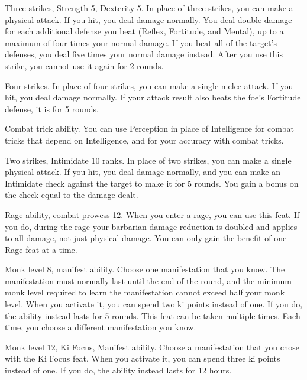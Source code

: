 \featpres Three strikes, Strength 5, Dexterity 5.
\featben In place of three strikes, you can make a physical attack.
If you hit, you deal damage normally.
You deal double damage for each additional defense you beat (Reflex, Fortitude, and Mental), up to a maximum of four times your normal damage.
If you beat all of the target's defenses, you deal five times your normal damage instead.
After you use this strike, you cannot use it again for 2 rounds.

\featpre Four strikes.
\featben In place of four strikes, you can make a single melee attack.
If you hit, you deal damage normally.
If your attack result also beats the foe's Fortitude defense, it is \immobilized for 5 rounds.

\featpre Combat trick ability.
\featben You can use Perception in place of Intelligence for combat tricks that depend on Intelligence, and for your accuracy with combat tricks.

\featpres Two strikes, Intimidate 10 ranks.
\featben In place of two strikes, you can make a single physical attack.
If you hit, you deal damage normally, and you can make an Intimidate check against the target to make it \shaken for 5 rounds.
You gain a bonus on the check equal to the damage dealt.

\featpres Rage ability, combat prowess 12.
\featben When you enter a rage, you can use this feat. If you do, during the rage your barbarian damage reduction is doubled and applies to all damage, not just physical damage.
 You can only gain the benefit of one Rage feat at a time.


\featpres Monk level 8, manifest \ki ability.
\featben Choose one \ki manifestation that you know.
The manifestation must normally last until the end of the round, and the minimum monk level required to learn the manifestation cannot exceed half your monk level.
When you activate it, you can spend two ki points instead of one.
If you do, the ability instead lasts for 5 rounds.
 This feat can be taken multiple times.
Each time, you choose a different \ki manifestation you know.

\featpres Monk level 12, Ki Focus, Manifest \ki ability.
\featben Choose a \ki manifestation that you chose with the Ki Focus feat.
When you activate it, you can spend three ki points instead of one.
If you do, the ability instead lasts for 12 hours.

